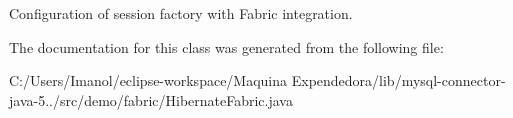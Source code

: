 Configuration of session factory with Fabric integration. 

The documentation for this class was generated from the following file\+:\begin{DoxyCompactItemize}
\item 
C\+:/\+Users/\+Imanol/eclipse-\/workspace/\+Maquina Expendedora/lib/mysql-\/connector-\/java-\/5../src/demo/fabric/Hibernate\+Fabric.\+java\end{DoxyCompactItemize}
